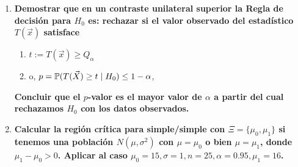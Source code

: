 \begin{enumerate}
  \smallskip
  \noindent\emph{Solución:} La distribución $t_n$ de Student con $n$ grados de libertad tiene densidad de probabilidad
  \[
    t_n \sim f(t) = k\left(1 + \frac{t^2}{n}\right)^{-(n+1)/2}, \quad k \equiv \frac{\Gamma\left(\frac{n+1}{2}\right)}{\sqrt{\pi n}\,\Gamma\left(\frac{n}{2}\right)}
  \]
  donde $\Gamma$ es la función gamma. El teorema de Fisher afirma $\overline{X}_n \perp S_n^2$. Además
  \[
    \overline{X}_n \sim N(\mu, \sigma^2/n) \perp \frac{n}{\sigma^2} S_n^2 \sim \chi^2_{n-1} \implies
  \]
  se obtiene como corolario que
  \[
    P_n := \sqrt{n-1}\,\frac{\overline{X}_n - \mu}{S_n} \sim t_{n-1}; \implies
  \]
  es un pivote y exploramos la condición
  \[
    1 - \alpha = \Prob(P \geq a) \iff a = \bar{F}_{t_{n-1}}^{-1}(1 - \alpha) = F_{t_{n-1}}^{-1}(\alpha)
  \]
  la región de rechazo es $F = \bigl(F_{t_{n-1}}^{-1}(\alpha), \infty\bigr)$.

  La condición de rechazo es $P_n(\omega) \in F$:
  \[
    \text{alternativamente } \sqrt{n-1}\,\frac{\overline{X}_n(\omega) - \mu}{S_n(\omega)} > F_{t_{n-1}}^{-1}(\alpha) \iff
  \]
  \[
    \overline{x}_n > \mu + \frac{S_n(\omega)}{\sqrt{n-1}}\,F_{t_{n-1}}^{-1}(\alpha)
  \]
  mientras que en el caso donde $\sigma$ es conocida la región de rechazo es
  \[
    \overline{x}_n > \mu + \frac{\sigma}{\sqrt{n}}\,\Phi^{-1}(\alpha)
  \]
  El $p$-nivel es bajo $H_0$
  \[
    p := \Prob(\overline{X}_n \geq \overline{X}_n(\omega) \mid \mu = \mu_0) = \Prob(P_n \geq P_n(\omega)) = \bar{F}_{t_{n-1}}(P_n(\omega))
  \]
  donde $P_n(\omega)$ es el valor observado para $P_n$.
  \item \textbf{Demostrar que en un contraste unilateral superior la Regla de decisión para $H_0$ es: rechazar si el valor observado del estadístico $T(\vec{x})$ satisface}
    \begin{enumerate}[label=(\alph*)]
      \item $t := T(\vec{x}) \geq Q_\alpha$
      \item o, $p = \mathbb{P}(T(\vec{X}) \geq t \mid H_0) \leq 1 - \alpha$,
    \end{enumerate}
    \textbf{Concluir que el $p$-valor es el mayor valor de $\alpha$ a partir del cual rechazamos $H_0$ con los datos observados.}

    \item \textbf{Calcular la región crítica para simple/simple con $\Xi = \{\mu_0, \mu_1\}$ si tenemos una población $N(\mu, \sigma^2)$ con $\mu = \mu_0$ o bien $\mu = \mu_1$, donde $\mu_1 - \mu_0 > 0$. Aplicar al caso $\mu_0 = 15, \sigma = 1, n = 25, \alpha = 0.95, \mu_1 = 16$.}


\end{enumerate}
